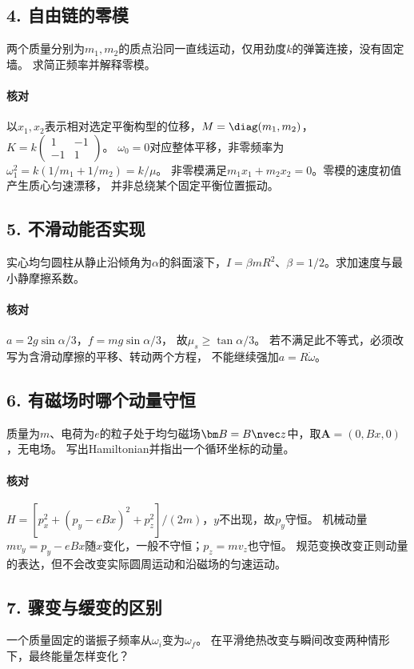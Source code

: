 \subsection*{4. 自由链的零模}
两个质量分别为$m_1,m_2$的质点沿同一直线运动，仅用劲度$k$的弹簧连接，没有固定墙。
求简正频率并解释零模。

\paragraph{核对}
以$x_1,x_2$表示相对选定平衡构型的位移，$M=\diag(m_1,m_2)$，$K=k\left(\begin{smallmatrix}1&-1\\-1&1\end{smallmatrix}\right)$。
$\omega_0=0$对应整体平移，非零频率为
$\omega_1^2=k(1/m_1+1/m_2)=k/\mu$。
非零模满足$m_1x_1+m_2x_2=0$。零模的速度初值产生质心匀速漂移，
并非总绕某个固定平衡位置振动。

\subsection*{5. 不滑动能否实现}
实心均匀圆柱从静止沿倾角为$\alpha$的斜面滚下，$I=\beta mR^2$、$\beta=1/2$。求加速度与最小静摩擦系数。

\paragraph{核对}
$a=2g\sin\alpha/3$，$f=mg\sin\alpha/3$，
故$\mu_s\geq\tan\alpha/3$。
若不满足此不等式，必须改写为含滑动摩擦的平移、转动两个方程，
不能继续强加$a=R\dot\omega$。

\subsection*{6. 有磁场时哪个动量守恒}
质量为$m$、电荷为$e$的粒子处于均匀磁场$\bm B=B\nvec z$中，取$\bm A=(0,Bx,0)$，无电场。
写出Hamiltonian并指出一个循环坐标的动量。

\paragraph{核对}
$H=[p_x^2+(p_y-eBx)^2+p_z^2]/(2m)$，$y$不出现，故$p_y$守恒。
机械动量$mv_y=p_y-eBx$随$x$变化，一般不守恒；$p_z=mv_z$也守恒。
规范变换改变正则动量的表达，但不会改变实际圆周运动和沿磁场的匀速运动。

\subsection*{7. 骤变与缓变的区别}
一个质量固定的谐振子频率从$\omega_i$变为$\omega_f$。
在平滑绝热改变与瞬间改变两种情形下，最终能量怎样变化？

